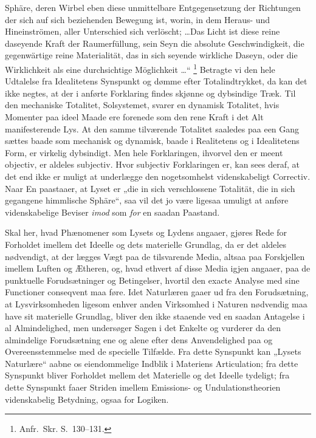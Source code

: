 \documentclass[12pt]{book}
\newcommand{\opage}[1]{\marginnote{\footnotesize\textit{[#1]}}}
\begin{document}
Sphäre, deren Wirbel eben diese unmittelbare Entgegensetzung der Richtungen der sich auf sich
beziehenden Bewegung ist, worin, in dem Heraus- und Hineinströmen, aller Unterschied sich
verlöscht; \ldots Das Licht ist diese reine daseyende Kraft der Raumerfüllung, sein Seyn die
absolute Geschwindigkeit, die gegenwärtige reine Materialität, das in sich seyende wirkliche
Daseyn, oder die Wirklichkeit als eine durchsichtige Möglichkeit \ldots“%
\footnote{Anfr.\ Skr. S.~130--131.}
Betragte vi den hele Udtalelse fra Idealitetens Synspunkt og dømme efter Totalindtrykket, da
kan det ikke negtes, at der i anførte Forklaring findes skjønne og dybsindige Træk. Til den
mechaniske Totalitet, Solsystemet, svarer en dynamisk Totalitet, hvis Momenter paa ideel
Maade ere forenede som den rene Kraft i det Alt manifesterende Lys. At den samme tilværende
Totalitet saaledes paa een Gang sættes baade som
\opage{375} mechanisk og dynamisk, baade i Realitetens og i Idealitetens Form, er virkelig dybsindigt.
Men hele Forklaringen, ihvorvel den er meent objectiv, er aldeles subjectiv. Hvor subjectiv
Forklaringen er, kan sees deraf, at det end ikke er muligt at underlægge den nogetsomhelst
videnskabeligt Correctiv. Naar En paastaaer, at Lyset er „die in sich verschlossene
Totalität, die in sich gegangene himmlische Sphäre“, saa vil det jo være ligesaa umuligt at
anføre videnskabelige Beviser \emph{imod} som \emph{for} en saadan Paastand.

Skal her, hvad Phænomener som Lysets og Lydens angaaer, gjøres Rede for Forholdet imellem det
Ideelle og dets materielle Grundlag, da er det aldeles nødvendigt, at der lægges Vægt paa de
tilsvarende Media, altsaa paa Forskjellen imellem Luften og Ætheren, og, hvad ethvert af
disse Media igjen angaaer, paa de punktuelle Forudsætninger og Betingelser, hvortil den
exacte Analyse med sine Functioner conseqvent maa føre. Idet Naturlæren gaaer ud fra den
Forudsætning, at Lysvirksomheden ligesom enhver anden Virksomhed i Naturen nødvendig maa have
sit materielle Grundlag, bliver den ikke staaende ved en saadan Antagelse i al
Almindelighed, men undersøger Sagen i det Enkelte og vurderer da den almindelige Forudsætning
ene og alene efter dens Anvendelighed paa og Overeensstemmelse med de specielle Tilfælde. Fra
dette Synspunkt kan „Lysets Naturlære“ aabne os eiendommelige Indblik i Materiens
Articulation; fra dette Synspunkt bliver Forholdet mellem det Materielle og det Ideelle
tydeligt; fra dette Synspunkt faaer Striden imellem Emissions- og Undulationstheorien
videnskabelig Betydning, ogsaa for Logiken.
\end{document}
